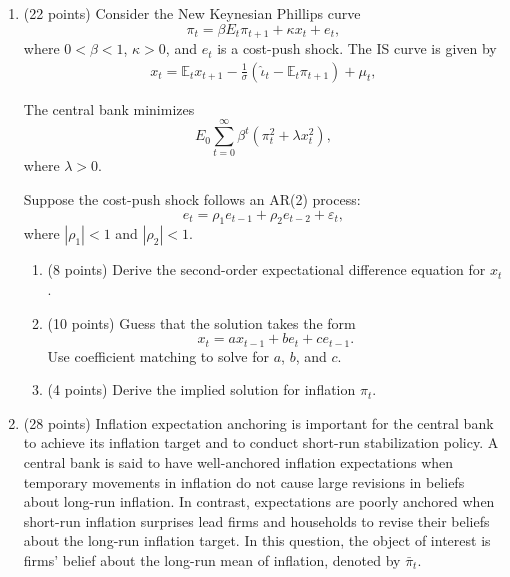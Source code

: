 \documentclass[12pt]{article}
\begin{document}
\begin{enumerate}[label=\arabic*.]
    \newpage
    \item (22 points) Consider the New Keynesian Phillips curve
    \begin{equation*}
        \pi_t = \beta E_t \pi_{t+1} + \kappa x_t + e_t,
    \end{equation*}
    where $0<\beta<1$, $\kappa>0$, and $e_t$ is a cost-push shock. The IS curve is given by
    \begin{align*}
        x_t = \mathbb{E}_t x_{t+1} - \frac{1}{\sigma} (\hat{\iota}_t - \mathbb{E}_t \pi_{t+1}) + \mu_t,
    \end{align*}
    
    The central bank minimizes
    \begin{equation*}
        E_0 \sum_{t=0}^{\infty} \beta^t
        \left( \pi_t^2 + \lambda x_t^2 \right),
    \end{equation*}
    where $\lambda>0$.
    
    Suppose the cost-push shock follows an AR(2) process:
    \begin{equation*}
        e_t = \rho_1 e_{t-1} + \rho_2 e_{t-2} + \varepsilon_t,
    \end{equation*}
    where $|\rho_1|<1$ and $|\rho_2|<1$.
    
    \begin{enumerate}[label=(\alph*)]
        \item (8 points) Derive the second-order expectational difference equation for $x_t$.
        
        \item (10 points) Guess that the solution takes the form
        \begin{equation*}
            x_t = a x_{t-1} + b e_t + c e_{t-1}.
        \end{equation*}
        Use coefficient matching to solve for $a$, $b$, and $c$.
        
        \item (4 points) Derive the implied solution for inflation $\pi_t$.
    \end{enumerate}

    \newpage
    \item (28 points) Inflation expectation anchoring is important for the central bank to achieve its inflation target and to conduct short-run stabilization policy. A central bank is said to have well-anchored inflation expectations when temporary movements in inflation do not cause large revisions in beliefs about long-run inflation. In contrast, expectations are poorly anchored when short-run inflation surprises lead firms and households to revise their beliefs about the long-run inflation target. In this question, the object of interest is firms' belief about the long-run mean of inflation, denoted by $\bar{\pi}_t$.
    

\end{enumerate}
\end{document}
